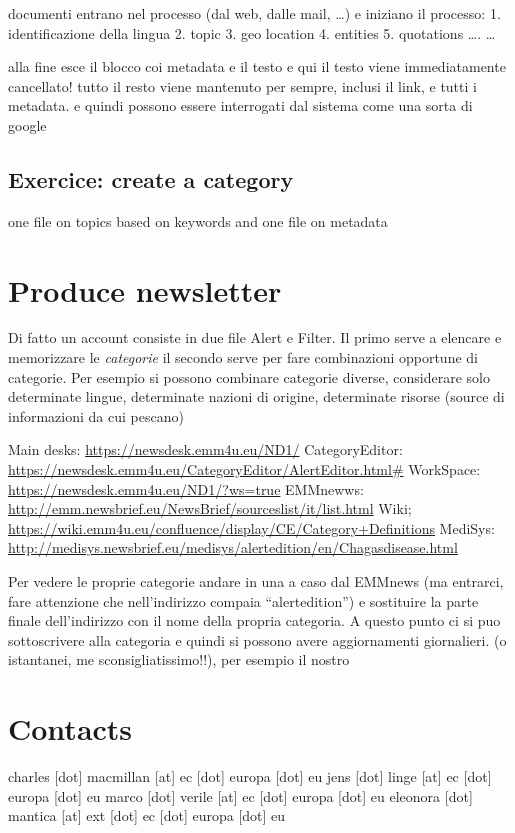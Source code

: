 \documentclass[]{book}
\theoremstyle{definition}
\theoremstyle{definition}
\theoremstyle{definition}
\theoremstyle{remark}
\begin{document}
documenti entrano nel processo (dal web, dalle mail, \ldots{}) e
iniziano il processo: 1. identificazione della lingua 2. topic 3. geo
location 4. entities 5. quotations \ldots{}. \ldots{}

alla fine esce il blocco coi metadata e il testo e qui il testo viene
immediatamente cancellato! tutto il resto viene mantenuto per sempre,
inclusi il link, e tutti i metadata. e quindi possono essere interrogati
dal sistema come una sorta di google

\subsection{Exercice: create a
category}\label{exercice-create-a-category}

one file on topics based on keywords and one file on metadata

\section{Produce newsletter}\label{produce-newsletter}

Di fatto un account consiste in due file Alert e Filter. Il primo serve
a elencare e memorizzare le \emph{categorie} il secondo serve per fare
combinazioni opportune di categorie. Per esempio si possono combinare
categorie diverse, considerare solo determinate lingue, determinate
nazioni di origine, determinate risorse (source di informazioni da cui
pescano)

Main desks: \url{https://newsdesk.emm4u.eu/ND1/} CategoryEditor:
\url{https://newsdesk.emm4u.eu/CategoryEditor/AlertEditor.html\#}
WorkSpace: \url{https://newsdesk.emm4u.eu/ND1/?ws=true} EMMnewws:
\url{http://emm.newsbrief.eu/NewsBrief/sourceslist/it/list.html} Wiki;
\url{https://wiki.emm4u.eu/confluence/display/CE/Category+Definitions}
MediSys:
\url{http://medisys.newsbrief.eu/medisys/alertedition/en/Chagasdisease.html}

Per vedere le proprie categorie andare in una a caso dal EMMnews (ma
entrarci, fare attenzione che nell'indirizzo compaia ``alertedition'') e
sostituire la parte finale dell'indirizzo con il nome della propria
categoria. A questo punto ci si puo sottoscrivere alla categoria e
quindi si possono avere aggiornamenti giornalieri. (o istantanei, me
sconsigliatissimo!!), per esempio il nostro

\section{Contacts}\label{contacts}

charles {[}dot{]} macmillan {[}at{]} ec {[}dot{]} europa {[}dot{]} eu
jens {[}dot{]} linge {[}at{]} ec {[}dot{]} europa {[}dot{]} eu marco
{[}dot{]} verile {[}at{]} ec {[}dot{]} europa {[}dot{]} eu eleonora
{[}dot{]} mantica {[}at{]} ext {[}dot{]} ec {[}dot{]} europa {[}dot{]}
eu


\end{document}
